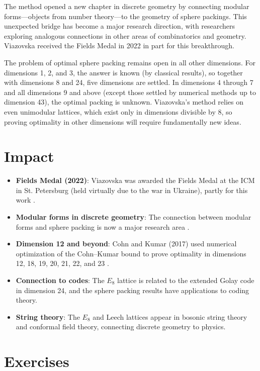 The method opened a new chapter in discrete geometry by connecting modular forms---objects from number theory---to the geometry of sphere packings. This unexpected bridge has become a major research direction, with researchers exploring analogous connections in other areas of combinatorics and geometry. Viazovska received the Fields Medal in 2022 in part for this breakthrough.

The problem of optimal sphere packing remains open in all other dimensions. For dimensions 1, 2, and 3, the answer is known (by classical results), so together with dimensions 8 and 24, five dimensions are settled. In dimensions 4 through 7 and all dimensions 9 and above (except those settled by numerical methods up to dimension 43), the optimal packing is unknown. Viazovska's method relies on even unimodular lattices, which exist only in dimensions divisible by 8, so proving optimality in other dimensions will require fundamentally new ideas.

\section{Impact}

\begin{itemize}
\item \textbf{Fields Medal (2022)}: Viazovska was awarded the Fields Medal at the ICM in St. Petersburg (held virtually due to the war in Ukraine), partly for this work \cite{fields2022}.
\item \textbf{Modular forms in discrete geometry}: The connection between modular forms and sphere packing is now a major research area \cite{viazovska2017, cohn2017}.
\item \textbf{Dimension 12 and beyond}: Cohn and Kumar (2017) used numerical optimization of the Cohn--Kumar bound to prove optimality in dimensions 12, 18, 19, 20, 21, 22, and 23 \cite{cohn2017b}.
\item \textbf{Connection to codes}: The $E_8$ lattice is related to the extended Golay code in dimension 24, and the sphere packing results have applications to coding theory.
\item \textbf{String theory}: The $E_8$ and Leech lattices appear in bosonic string theory and conformal field theory, connecting discrete geometry to physics.
\end{itemize}

\section{Exercises}

